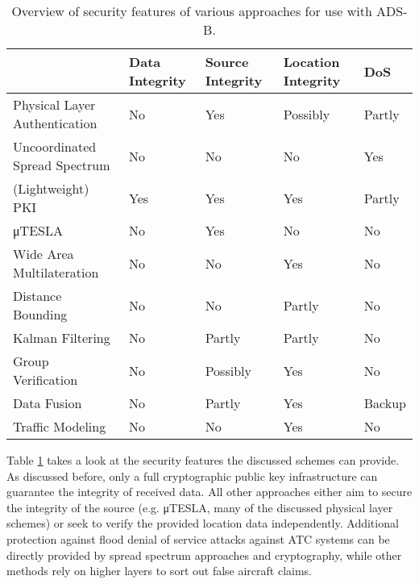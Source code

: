 \documentclass[english]{IEEEtran}
\providecommand{\tabularnewline}{\\}
\begin{document}
\begin{table}[t]
\begin{tabular}{|>{\centering}p{2.4cm}|>{\centering}p{1.1cm}|>{\centering}p{1.1cm}|>{\centering}p{1.1cm}|>{\centering}p{1.1cm}|}
\hline 
 & Data Integrity & Source Integrity & Location Integrity & DoS\tabularnewline
\hline 
\hline 
Physical Layer Authentication & No & Yes & Possibly & Partly\tabularnewline
\hline 
Uncoordinated Spread Spectrum & No & No & No & Yes\tabularnewline
\hline 
(Lightweight) PKI & Yes & Yes & Yes & Partly\tabularnewline
\hline 
μTESLA & No & Yes & No & No\tabularnewline
\hline 
Wide Area Multilateration & No & No & Yes & No\tabularnewline
\hline 
Distance Bounding & No & No & Partly & No\tabularnewline
\hline 
Kalman Filtering & No & Partly & Partly & No\tabularnewline
\hline 
Group Verification & No & Possibly & Yes & No\tabularnewline
\hline 
Data Fusion & No & Partly & Yes & Backup\tabularnewline
\hline 
Traffic Modeling & No & No & Yes & No\tabularnewline
\hline 
\end{tabular}

\caption{Overview of security features of various approaches for use with ADS-B.
\label{tab:Overview2}}
\end{table}


Table \ref{tab:Overview2} takes a look at the security features the
discussed schemes can provide. As discussed before, only a full cryptographic
public key infrastructure can guarantee the integrity of received
data. All other approaches either aim to secure the integrity of the
source (e.g. μTESLA, many of the discussed physical layer schemes)
or seek to verify the provided location data independently. Additional
protection against flood denial of service attacks against ATC systems
can be directly provided by spread spectrum approaches and cryptography,
while other methods rely on higher layers to sort out false aircraft
claims.
\end{document}
